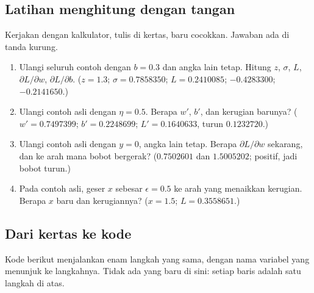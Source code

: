 \subsection{Latihan menghitung dengan tangan}

Kerjakan dengan kalkulator, tulis di kertas, baru cocokkan. Jawaban ada di tanda kurung.

\begin{catatan}
\begin{enumerate}
  \item Ulangi seluruh contoh dengan $b = 0.3$ dan angka lain tetap. Hitung $z$, $\sigma$,
        $L$, $\partial L/\partial w$, $\partial L/\partial b$.
        ($z = 1.3$; $\sigma = 0.7858350$; $L = 0.2410085$; $-0.4283300$; $-0.2141650$.)
  \item Ulangi contoh asli dengan $\eta = 0.5$. Berapa $w'$, $b'$, dan kerugian barunya?
        ($w' = 0.7497399$; $b' = 0.2248699$; $L' = 0.1640633$, turun $0.1232720$.)
  \item Ulangi contoh asli dengan $y = 0$, angka lain tetap. Berapa $\partial L/\partial w$
        sekarang, dan ke arah mana bobot bergerak?
        ($0.7502601$ dan $1.5005202$; positif, jadi bobot turun.)
  \item Pada contoh asli, geser $x$ sebesar $\epsilon = 0.5$ ke arah yang menaikkan
        kerugian. Berapa $x$ baru dan kerugiannya? ($x = 1.5$; $L = 0.3558651$.)
\end{enumerate}
\end{catatan}

\subsection{Dari kertas ke kode}

Kode berikut menjalankan enam langkah yang sama, dengan nama variabel yang menunjuk ke
langkahnya. Tidak ada yang baru di sini: setiap baris adalah satu langkah di atas.

